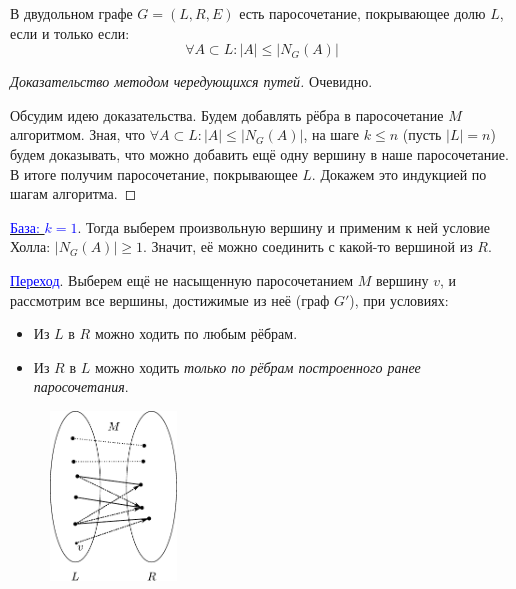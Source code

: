 \begin{frame}[t]
    \begin{theorem}[P.Hall, 1935]
        В двудольном графе $G = \left( L, R, E \right) $ есть паросочетание, покрывающее долю $L$, если и только если:  $$\forall A \subset L: |A| \leq |N_G(A)|$$
    \end{theorem}
    
    \begin{proof}[Доказательство методом чередующихся путей]
        \renewcommand{\qedsymbol}{}
        \fbox{$ \Rightarrow $} Очевидно.
        
        \fbox{$ \Leftarrow $} Обсудим идею доказательства. Будем добавлять рёбра в паросочетание $M$ алгоритмом. Зная, что $\forall A \subset L: |A| \leq |N_G(A)|$, на шаге $k \leq n$ (пусть $|L| = n$) будем доказывать, что можно добавить ещё одну вершину в наше паросочетание. В итоге получим паросочетание, покрывающее $L$. Докажем это индукцией по шагам алгоритма.
    \end{proof}
\end{frame}

\begin{frame}[t]
    \small
    \underline{\textcolor{blue}{База: $k = 1$}}. Тогда выберем произвольную вершину и применим к ней условие Холла:  $|N_G (A)| \geq 1$. Значит, её можно соединить с какой-то вершиной из $R$.
    
    \underline{\textcolor{blue}{Переход}}. Выберем ещё не насыщенную паросочетанием $M$ вершину $v$, и рассмотрим все вершины, достижимые из неё (граф $G'$), при условиях:
     \begin{itemize}
        \item Из $L$ в $R$ можно ходить по любым рёбрам.
        \item Из $R$ в $L$ можно ходить \textit{только по рёбрам построенного ранее паросочетания}.
    \end{itemize}

    \begin{figure}[h]
        \centering
        \includegraphics[width=0.3\textwidth]{images/condition}
    \end{figure}
    
\end{frame}

